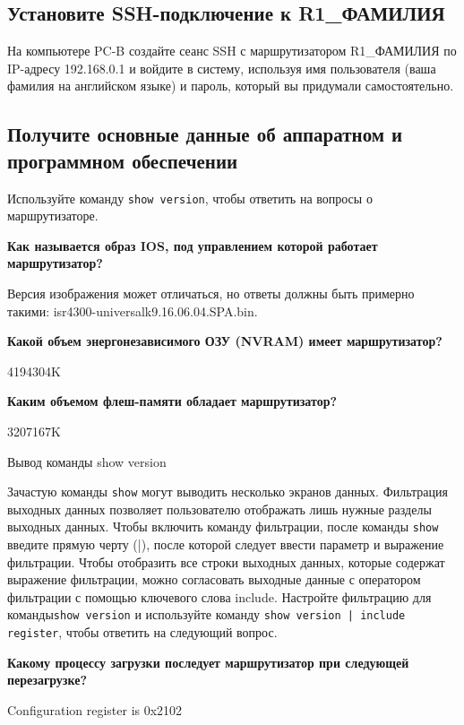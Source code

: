 \subsection{Установите SSH-подключение к R1\_ФАМИЛИЯ}

На компьютере PC-B создайте сеанс SSH с маршрутизатором R1\_ФАМИЛИЯ
по IP-адресу 192.168.0.1 и войдите в систему, используя имя пользователя
(ваша фамилия на английском языке) и пароль,
который вы придумали самостоятельно.

\subsection{Получите основные данные об аппаратном и программном обеспечении}

Используйте команду \texttt{show version},
чтобы ответить на вопросы о маршрутизаторе.

\textbf{Как называется образ IOS,
под управлением которой работает маршрутизатор?}

Версия изображения может отличаться, но ответы должны быть примерно такими:
isr4300-universalk9.16.06.04.SPA.bin.

\textbf{Какой объем энергонезависимого ОЗУ (NVRAM) имеет маршрутизатор?}

4194304K

\textbf{Каким объемом флеш-памяти обладает маршрутизатор?}

3207167K

\begin{image}
	\caption{Вывод команды show version}
\end{image}

Зачастую команды \texttt{show} могут выводить несколько экранов данных.
Фильтрация выходных данных позволяет пользователю отображать
лишь нужные разделы выходных данных.
Чтобы включить команду фильтрации, после команды \texttt{show}
введите прямую черту (|),
после которой следует ввести параметр и выражение фильтрации.
Чтобы отобразить все строки выходных данных,
которые содержат выражение фильтрации,
можно согласовать выходные данные с оператором фильтрации
с помощью ключевого слова include.
Настройте фильтрацию для команды\texttt{show version} 
и используйте команду \texttt{show version | include register},
чтобы ответить на следующий вопрос.

\textbf{Какому процессу загрузки последует маршрутизатор
при следующей перезагрузке?}

Configuration register is 0x2102

